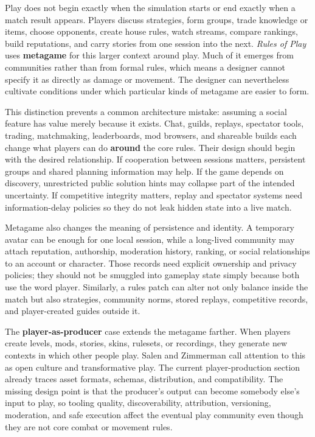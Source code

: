 \hypertarget{06-engine-ii-ch046-metagame-is-part-of-the-designed-context-even-when-it-is-not-directly-controllable}{}

Play does not begin exactly when the simulation starts or end exactly when a match result appears. Players discuss strategies, form groups, trade knowledge or items, choose opponents, create house rules, watch streams, compare rankings, build reputations, and carry stories from one session into the next. \emph{Rules of Play} uses \textbf{metagame} for this larger context around play. Much of it emerges from communities rather than from formal rules, which means a designer cannot specify it as directly as damage or movement. The designer can nevertheless cultivate conditions under which particular kinds of metagame are easier to form.

This distinction prevents a common architecture mistake: assuming a social feature has value merely because it exists. Chat, guilds, replays, spectator tools, trading, matchmaking, leaderboards, mod browsers, and shareable builds each change what players can do \textbf{around} the core rules. Their design should begin with the desired relationship. If cooperation between sessions matters, persistent groups and shared planning information may help. If the game depends on discovery, unrestricted public solution hints may collapse part of the intended uncertainty. If competitive integrity matters, replay and spectator systems need information-delay policies so they do not leak hidden state into a live match.

Metagame also changes the meaning of persistence and identity. A temporary avatar can be enough for one local session, while a long-lived community may attach reputation, authorship, moderation history, ranking, or social relationships to an account or character. Those records need explicit ownership and privacy policies; they should not be smuggled into gameplay state simply because both use the word player. Similarly, a rules patch can alter not only balance inside the match but also strategies, community norms, stored replays, competitive records, and player-created guides outside it.

The \textbf{player-as-producer} case extends the metagame farther. When players create levels, mods, stories, skins, rulesets, or recordings, they generate new contexts in which other people play. Salen and Zimmerman call attention to this as open culture and transformative play. The current player-production section already traces asset formats, schemas, distribution, and compatibility. The missing design point is that the producer's output can become somebody else's input to play, so tooling quality, discoverability, attribution, versioning, moderation, and safe execution affect the eventual play community even though they are not core combat or movement rules.

